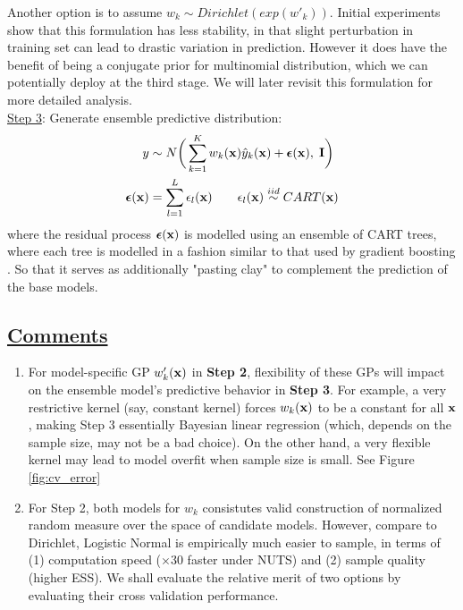 \documentclass[11pt]{article}
\theoremstyle{definition}
\begin{document}
Another option is to assume $w_k \sim Dirichlet(exp(w'_k))$. Initial experiments show that this formulation has less stability, in that slight perturbation in training set can lead to drastic variation in prediction. However it does have the benefit of being a conjugate prior for multinomial distribution, which we can potentially deploy at the third stage. We will later revisit this formulation for more detailed analysis.\\

\underline{Step 3}: Generate ensemble predictive distribution:
\begin{align*}
y &\sim N \bigg(
\sum_{k=1}^K w_k({\bf x}) \hat{y}_k({\bf x}) + \boldsymbol{\epsilon}({\bf x}), \; {\bf I} \bigg)\\
\boldsymbol{\epsilon}({\bf x}) &= \sum_{l=1}^L\epsilon_l({\bf x}) \qquad \epsilon_{l}({\bf x}) \stackrel{iid}{\sim} CART({\bf x})
\end{align*}
where the residual process $\boldsymbol{\epsilon}({\bf x})$ is modelled  using an ensemble of CART trees, where each tree is modelled in a fashion similar to that used by gradient boosting \citep{chen_xgboost:_2016}. So that it serves as additionally "pasting clay" to complement the prediction of the base models.

\subsection*{\underline{Comments}}

\begin{enumerate}
\item For model-specific GP $w'_k({\bf x})$ in \textbf{Step 2}, flexibility of these GPs will impact on the ensemble model's predictive behavior in \textbf{Step 3}. For example, a very restrictive kernel (say, constant kernel) forces $w_k({\bf x})$ to be a constant for all ${\bf x}$, making Step 3  essentially Bayesian linear regression (which, depends on the sample size, may not be a bad choice). On the other hand, a very flexible kernel may lead to model overfit when sample size is small. See Figure \ref{fig:cv_error}
\item For Step 2, both models for $w_k$ consistutes valid construction of normalized random measure over the space of candidate models. However, compare to Dirichlet, Logistic Normal is empirically much easier to sample,  in terms of (1) computation speed ($\times$30 faster under NUTS) and (2) sample quality (higher ESS). We shall evaluate the relative merit of two options by evaluating their cross validation performance.
\end{enumerate}
\end{document}
